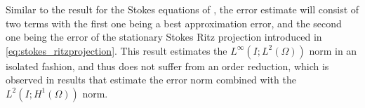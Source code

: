 \documentclass{m2an}
\newcommand{\Oprod}[1]{\left( #1 \right)_{\Omega}}
\newcommand{\ukh}{u_{kh}}
\newcommand{\zkh}{z_{kh}}
\newcommand{\LinfLtwo}{L^\infty(I;L^2(\Omega))}
\begin{document}
%
% 
%
Similar to the result for the Stokes equations of ,
the error estimate will consist of two terms with the first one being a best approximation
error, and the second one being the error of the stationary Stokes Ritz projection introduced in 
\eqref{eq:stokes_ritzprojection}.
This result estimates the $L^\infty(I;L^2(\Omega))$ norm in an isolated fashion, and thus does not suffer 
from an order reduction, which is observed in results that estimate the error norm combined with the
$L^2(I;H^1(\Omega))$ norm.
\end{document}
